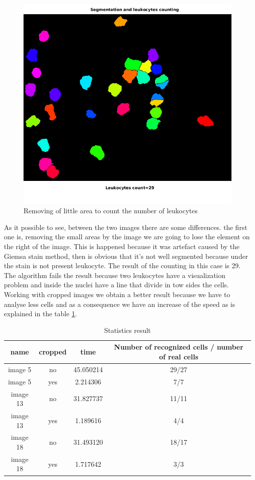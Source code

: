 \begin{figure}
\centering
	\begin{center}
		\includegraphics[scale=0.5]{img/final/figure9.png}
		\caption{Removing of little area to count the number of leukocytes}
		\label{fig:fig9}
	\end{center}
\end{figure}
\bigskip

As it possible to see, between the two images there are some differences. the first one is, removing the small areas by the image we are going to lose the element on the right of the image. This is happened because it was artefact caused by the Giemsa stain method, then is obvious that it's not well segmented because under the stain is not present  leukocyte. The result of the counting in this case is 29. The algorithm fails the result because two leukocytes have a visualization problem and inside the nuclei have a line that divide in tow sides the cells.
Working with cropped images we obtain a better result because we have to analyse less cells and as a consequence we have an increase of the speed as is explained in the table \ref{statistics}.
\begin{table}
\centering
\begin{tabular}{|c|c|c|c|}
\hline 
name & cropped & time & Number of recognized cells / number of real cells\\ 
\hline 
image 5 & no & 45.050214 & 29/27\\ 
\hline 
image 5 & yes & 2.214306 & 7/7\\ 
\hline 
image 13 & no & 31.827737 & 11/11 \\ 
\hline 
image 13 & yes & 1.189616 & 4/4 \\ 
\hline 
image 18 & no & 31.493120 & 18/17\\ 
\hline 
image 18 & yes & 1.717642 & 3/3 \\ 
\hline 
\end{tabular} 
\caption{Statistics result}
\label{statistics}
\end{table}

